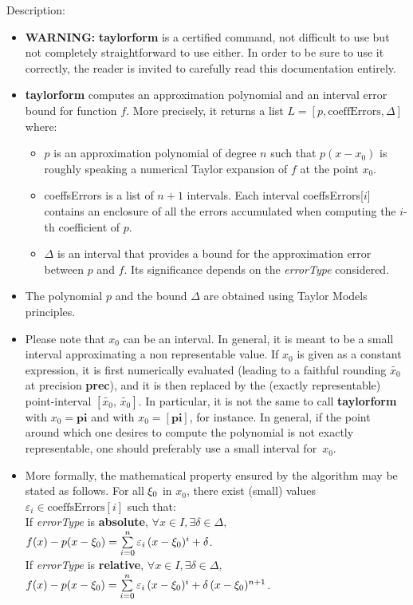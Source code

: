\noindent Description: \begin{itemize}

\item \textbf{WARNING:} \textbf{taylorform} is a certified command, not difficult to use but not
   completely straightforward to use either. In order to be sure to use it
   correctly, the reader is invited to carefully read this documentation
   entirely.

\item \textbf{taylorform} computes an approximation polynomial and an interval error
   bound for function $f$. More precisely, it returns a list
   $L = \left[p, \textrm{coeffErrors},\Delta \right]$ where:
   \begin{itemize}
   \item $p$ is an approximation polynomial of degree $n$ such that $p(x-x_0)$ is
   roughly speaking a numerical Taylor expansion of $f$ at the point $x_0$.
   \item coeffsErrors is a list of $n+1$ intervals. Each interval coeffsErrors[$i$]
   contains an enclosure of all the errors accumulated when computing the $i$-th
   coefficient of $p$.
   \item $\Delta$ is an interval that provides a bound for the approximation error
   between $p$ and $f$. Its significance depends on the \emph{errorType} considered.
   \end{itemize}

\item The polynomial $p$ and the bound  $\Delta$ are obtained using Taylor Models
   principles.

\item Please note that $x_0$ can be an interval. In general, it is meant to be a
   small interval approximating a non representable value. If $x_0$ is given as a
   constant expression, it is first numerically evaluated (leading to a faithful
   rounding $\tilde{x_0}$ at precision \textbf{prec}), and it is then replaced by the (exactly
   representable) point-interval $[\tilde{x_0},\,\tilde{x_0}]$. In particular, it is not
   the same to call \textbf{taylorform} with $x_0 = \textbf{pi}$ and with $x_0 = [\textbf{pi}]$, for instance.
   In general, if the point around which one desires to compute the polynomial
   is not exactly representable, one should preferably use a small interval
   for~$x_0$.

\item More formally, the mathematical property ensured by the algorithm may be
   stated as follows. For all $\xi_0$ in $x_0$, there exist (small) values
   $\varepsilon_i \in \textrm{coeffsErrors}[i]$ such that:
   \\
   If \emph{errorType} is \textbf{absolute}, $\forall x \in I, \exists \delta \in \Delta,\,$
   $f(x)-p(x-\xi_0) = \sum\limits_{i=0}^{n} \varepsilon_i\, (x-\xi_0)^i + \delta$.
   \\
   If \emph{errorType} is \textbf{relative}, $\forall x \in I, \exists \delta \in \Delta,\,$
   $f(x)-p(x-\xi_0) = \sum\limits_{i=0}^{n} \varepsilon_i\, (x-\xi_0)^i + \delta\,(x-\xi_0)^{n+1}$.


\end{itemize}
